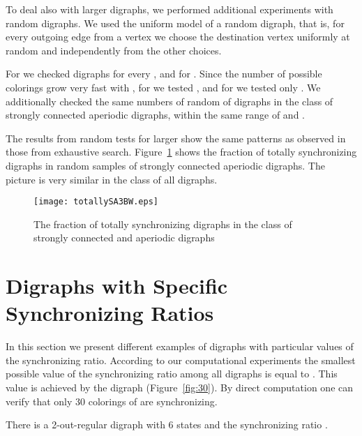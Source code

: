 \documentclass[runningheads]{llncs}
\begin{document}
To deal also with larger digraphs, we performed additional experiments with random digraphs.
We used the uniform model of a random digraph, that is, for every outgoing edge from a vertex  we choose the destination vertex uniformly at random and independently from the other choices.

For  we checked  digraphs for every , and  for .
Since the number of possible colorings grow very fast with , for  we tested , and for  we tested only .
We additionally checked the same numbers of random of digraphs in the class of strongly connected aperiodic digraphs, within the same range of  and .

The results from random tests for larger  show the same patterns as observed in those from exhaustive search.
Figure~\ref{fig:totally} shows the fraction of totally synchronizing digraphs in random samples of strongly connected aperiodic digraphs.
The picture is very similar in the class of all digraphs.


\begin{comment}
\begin{figure}
\centering
\texttt{[image: ratio.eps]}
\caption{Average synchronizing ratio of random digraphs.\MSZ{Add k=4.}}
\label{fig:ratio}
\end{figure}
\end{comment}

\begin{figure}
\centering
\texttt{[image: totallySA3BW.eps]}
\caption{The fraction of totally synchronizing digraphs in the class of strongly connected and aperiodic digraphs}
\label{fig:totally}
\end{figure}


\section{Digraphs with Specific Synchronizing Ratios}

In this section we present different examples of digraphs with particular values of the synchronizing ratio.
According to our computational experiments the smallest possible value of the synchronizing ratio among all digraphs is equal to . This value is achieved by the digraph  (Figure~\ref{fig:30}).
By direct computation one can verify that only 30 colorings of  are synchronizing.

\begin{proposition}
There is a 2-out-regular digraph with 6 states and the synchronizing ratio .
\end{proposition}
\end{document}
